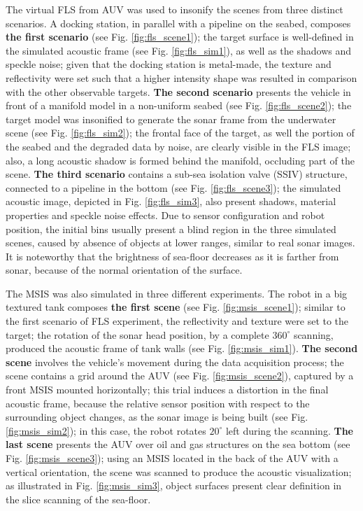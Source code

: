 \documentclass[final,5p,times]{elsarticle}
\begin{document}
The virtual FLS from AUV was used to insonify the scenes from three distinct
scenarios. A docking station, in parallel with a pipeline on the seabed,
composes \textbf{the first scenario} (see Fig. \ref{fig:fls_scene1}); the
target surface is well-defined in the simulated acoustic frame (see
Fig. \ref{fig:fls_sim1}), as well as the shadows and speckle noise; given that the docking station is metal-made, the texture and reflectivity were set such
that a higher intensity shape was resulted in comparison with the other observable targets.
\textbf{The second scenario} presents the vehicle in front of a manifold model
in a non-uniform seabed (see Fig. \ref{fig:fls_scene2}); the target model was
insonified to generate the sonar frame from the underwater scene (see Fig. \ref{fig:fls_sim2}); the frontal
face of the target, as well the portion of the seabed and the degraded data
by noise, are clearly visible in the FLS image; also, a long acoustic shadow
is formed behind the manifold, occluding part of the scene. \textbf{The
third scenario} contains a sub-sea isolation valve (SSIV) structure, connected
to a pipeline in the bottom (see Fig. \ref{fig:fls_scene3}); the simulated
acoustic image, depicted in Fig. \ref{fig:fls_sim3}, also present shadows,
material properties and speckle noise effects. Due to sensor configuration and
robot position, the initial bins usually present a blind region in the three
simulated scenes, caused by absence of objects at lower ranges, similar to real
sonar images. It is noteworthy that the brightness of sea-floor decreases as it is
farther from sonar, because of the normal orientation of the surface.

The MSIS was also simulated in three different experiments. The robot in a
big textured tank composes \textbf{the first scene} (see Fig.
\ref{fig:msis_scene1}); similar to the first scenario of FLS experiment,
the reflectivity and texture were set to the target; the rotation of the
sonar head position, by a complete $360^{\circ}$ scanning, produced the acoustic
frame of tank walls (see Fig. \ref{fig:msis_sim1}). \textbf{The second scene}
involves the vehicle's movement during the data acquisition process; the scene
contains a grid around the AUV (see Fig. \ref{fig:msis_scene2}), captured by a front MSIS mounted horizontally; this trial induces a distortion in the final
acoustic frame, because the relative sensor position with respect to the
surrounding object changes, as the sonar image is being built (see
Fig. \ref{fig:msis_sim2}); in this case, the robot rotates $20^{\circ}$ left
during the scanning. \textbf{The last scene} presents the AUV over oil
and gas structures on the sea bottom (see Fig. \ref{fig:msis_scene3});
using an MSIS located in the back of the AUV with a vertical orientation, the scene was scanned to produce the acoustic visualization; as illustrated in Fig. \ref{fig:msis_sim3}, object surfaces present clear definition in the slice scanning of the sea-floor.
\end{document}
